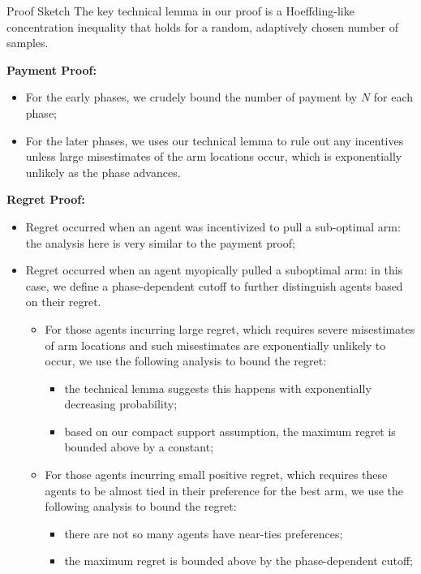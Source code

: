 \documentclass[final]{beamer}
\newlength{\onecolwid}
\begin{document}
\begin{frame}[t]
\begin{columns}[t]
\begin{column}{\onecolwid}
\begin{block}{Proof Sketch}
The key technical lemma in our proof is a Hoeffding-like concentration inequality that holds for a random, adaptively chosen number of samples.

\vspace{1cm}

\textbf{Payment Proof:}
\begin{itemize}
\item For the early phases, we crudely bound the number of payment by $N$ for each phase;
\item For the later phases, we uses our technical lemma to rule out any incentives unless large misestimates of the arm locations occur, which is exponentially unlikely as the phase advances.
\end{itemize}

\vspace{1cm}

\textbf{Regret Proof:}
\begin{itemize}
\item Regret occurred when an agent was incentivized to pull a sub-optimal arm: the analysis here is very similar to the payment proof;
\item Regret occurred when an agent myopically pulled a suboptimal arm: in this case, we define a phase-dependent cutoff to further distinguish agents based on their regret.
\begin{itemize}
\item For those agents incurring large regret, which requires severe misestimates of arm locations and such misestimates are exponentially unlikely to occur, we use the following analysis to bound the regret:
\begin{itemize}
\item the technical lemma suggests this happens with exponentially decreasing probability;
\item based on our compact support assumption, the maximum regret is bounded above by a constant;
\end{itemize}
\item For those agents incurring small positive regret, which requires these agents to be almost tied in their preference for the best arm, we use the following analysis to bound the regret: 
\begin{itemize}
\item there are not so many agents have near-ties preferences; 
\item the maximum regret is bounded above by the phase-dependent cutoff;
\end{itemize}
\end{itemize}
\end{itemize}
\vspace{1cm}



\end{block}
\end{column}
\end{columns}
\end{frame}
\end{document}
